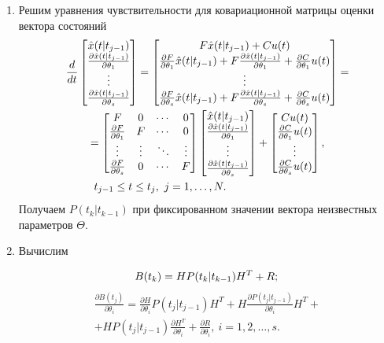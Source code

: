 \documentclass[a4paper,14pt]{extarticle}
\newcommand{\pd}[2]{\frac{\partial #1}{\partial #2}}
\begin{document}
\begin{enumerate}
\item Решим уравнения чувствительности для ковариационной матрицы оценки
	вектора состояний
\begin{multline*}
	\frac{d}{dt}	
	\begin{bmatrix}
		\hat{x}(t|t_{j-1}) \\
		\pd{\hat{x}(t|t_{j-1})}{\theta_1} \\
		\vdots \\
		\pd{\hat{x}(t|t_{j-1})}{\theta_s} \\
	\end{bmatrix} =
	\begin{bmatrix}
		F \hat{x}(t|t_{j-1}) + C u(t) \\
		\pd{F}{\theta_1} \hat{x}(t|t_{j-1}) + F \pd{\hat{x}(t|t_{j-1})}{\theta_1} +
			\pd{C}{\theta_1} u(t) \\
		\vdots \\
		\pd{F}{\theta_s} \hat{x}(t|t_{j-1}) + F \pd{\hat{x}(t|t_{j-1})}{\theta_s} +
			\pd{C}{\theta_s} u(t) 
	\end{bmatrix} = \\ =
	\begin{bmatrix}
		F & 0 & \cdots & 0 \\
		\pd{F}{\theta_1} & F & \cdots & 0 \\
		\vdots & \vdots & \ddots & \vdots \\
		\pd{F}{\theta_s} & 0 & \cdots & F
	\end{bmatrix}
	\begin{bmatrix}
		\hat{x}(t|t_{j-1}) \\
		\pd{\hat{x}(t|t_{j-1})}{\theta_1} \\
		\vdots \\
		\pd{\hat{x}(t|t_{j-1})}{\theta_s}
	\end{bmatrix} +
	\begin{bmatrix}
		C u(t) \\
		\pd{C}{\theta_1} u(t) \\
		\vdots \\
		\pd{C}{\theta_s} u(t)
	\end{bmatrix},\\ t_{j-1} \le t \le t_j,\ j = 1,\ldots,N.
	\hspace{0.25\textwidth}
\end{multline*}
Получаем $P(t_k|t_{k-1})$ при фиксированном значении вектора неизвестных
параметров $\Theta$.

\item Вычислим

	\[
	B(t_k) = H P(t_k|t_{k-1}) H^T + R; \\
\]
\begin{multline*}
	\pd{B(t_j)}{\theta_i} = \pd{H}{\theta_i} P(t_j|t_{j-1}) H^T + H
	\pd{P(t_j|t_{j-1})}{\theta_i} H^T + \\ + H P(t_j|t_{j-1}) \pd{H^T}{\theta_i} +
	\pd{R}{\theta_i},\ i = 1, 2, \ldots, s.
\end{multline*}


\end{enumerate}
\end{document}
